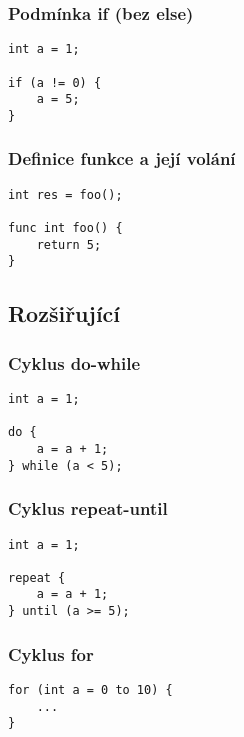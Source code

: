 \documentclass[czech, oth, kiv, he, iso690numb, viewonly]{fasthesis}
\begin{document}
    \subsubsection*{Podmínka if (bez else)}
    \begin{verbatim}
int a = 1;

if (a != 0) {
    a = 5;
}
    \end{verbatim}

    \subsubsection*{Definice funkce a její volání}
    \begin{verbatim}
int res = foo();

func int foo() {
    return 5;
}
    \end{verbatim}

    \subsection{Rozšiřující}

    \subsubsection*{Cyklus do-while}
    \begin{verbatim}
int a = 1;

do {
    a = a + 1;
} while (a < 5);
    \end{verbatim}

    \subsubsection*{Cyklus repeat-until}
    \begin{verbatim}
int a = 1;

repeat {
    a = a + 1;
} until (a >= 5);
    \end{verbatim}

    \subsubsection*{Cyklus for}
    \begin{verbatim}
for (int a = 0 to 10) {
    ...
}
    \end{verbatim}
\end{document}
